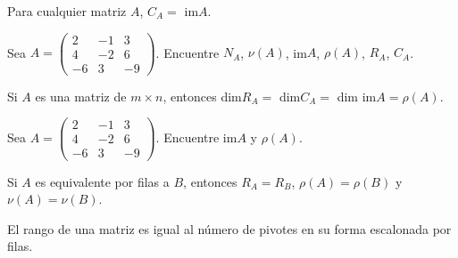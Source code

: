     \begin{thm}
    Para cualquier matriz $A$, $C_A =$ im$A$.
    \end{thm}
    
    \begin{ejem}
    Sea $A = \begin{pmatrix} 2 & -1 & 3 \\ 4 & -2 & 6 \\ -6 & 3 & -9 \end{pmatrix}$. Encuentre $N_A$, $\nu(A)$, im$A$, $\rho(A)$, $R_A$, $C_A$.
    \end{ejem}
    






\begin{thm}
Si $A$ es una matriz de $m \times n$, entonces dim$R_A=$ dim$C_A=$ dim im$A = \rho (A)$.
\end{thm}

\begin{ejem}
Sea $A = \begin{pmatrix} 2 & -1 & 3 \\ 4 & -2 & 6 \\ -6 & 3 & -9 \end{pmatrix}$. Encuentre im$A$ y $\rho(A)$.
\end{ejem}

\begin{thm}
Si $A$ es equivalente por filas a $B$, entonces $R_A = R_B$, $\rho (A) = \rho (B)$ y $\nu (A) = \nu (B)$.
\end{thm}





\begin{thm}
El rango de una matriz es igual al número de pivotes en su forma escalonada por filas.
\end{thm}

